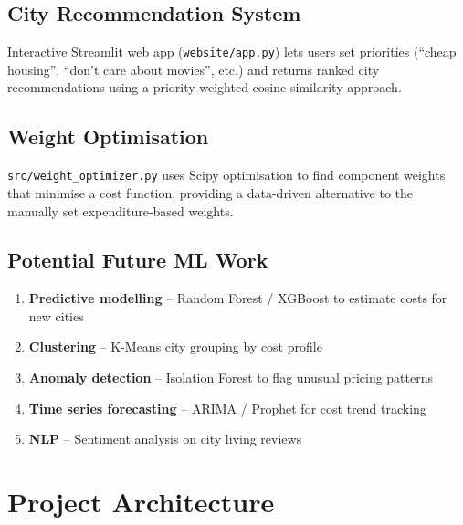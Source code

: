 \documentclass[12pt,a4paper]{article}
\begin{document}
\subsection{City Recommendation System}

Interactive Streamlit web app (\texttt{website/app.py}) lets users set priorities
(``cheap housing'', ``don't care about movies'', etc.) and returns ranked city
recommendations using a priority-weighted cosine similarity approach.

\subsection{Weight Optimisation}

\texttt{src/weight\_optimizer.py} uses Scipy optimisation to find component weights
that minimise a cost function, providing a data-driven alternative to the manually
set expenditure-based weights.

\subsection{Potential Future ML Work}

\begin{enumerate}
  \item \textbf{Predictive modelling} -- Random Forest / XGBoost to estimate costs for new cities
  \item \textbf{Clustering} -- K-Means city grouping by cost profile
  \item \textbf{Anomaly detection} -- Isolation Forest to flag unusual pricing patterns
  \item \textbf{Time series forecasting} -- ARIMA / Prophet for cost trend tracking
  \item \textbf{NLP} -- Sentiment analysis on city living reviews
\end{enumerate}

\section{Project Architecture}
\end{document}

